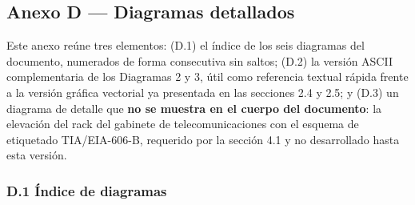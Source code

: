 \documentclass[11pt,a4paper]{article}
\begin{document}
\subsection{Anexo D --- Diagramas detallados}\label{anexo-d-diagramas-detallados}

Este anexo reúne tres elementos: (D.1) el índice de los seis diagramas del documento, numerados de forma consecutiva sin saltos; (D.2) la versión ASCII complementaria de los Diagramas 2 y 3, útil como referencia textual rápida frente a la versión gráfica vectorial ya presentada en las secciones 2.4 y 2.5; y (D.3) un diagrama de detalle que \textbf{no se muestra en el cuerpo del documento}: la elevación del rack del gabinete de telecomunicaciones con el esquema de etiquetado TIA/EIA-606-B, requerido por la sección 4.1 y no desarrollado hasta esta versión.

\subsubsection{D.1 Índice de diagramas}\label{d.1-uxedndice-de-diagramas}
\end{document}
